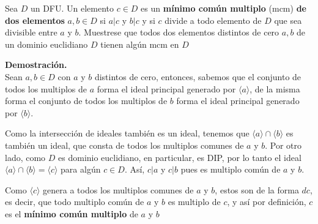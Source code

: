 Sea $D$ un DFU. Un elemento $c \in D$ es un \textbf{mínimo común multiplo} (mcm) \textbf{de dos elementos} $a,b \in D$ si $a | c$ y $b | c$ y si $c$ divide a todo elemento de $D$ que sea divisible entre $a$ y $b$. Muestrese que todos dos elementos distintos de cero $a,b$ de un dominio euclidiano $D$ tienen algún mcm en $D$

\textbf{Demostración.} \\
Sean $a,b \in D$ con $a$ y $b$ distintos de cero, entonces, sabemos que el conjunto de todos los multiplos de $a$ forma el ideal principal generado por $\langle a \rangle$, de la misma forma el conjunto de todos los multiplos de $b$ forma el ideal principal generado por $\langle b \rangle$. \smallskip
    
Como la intersección de ideales también es un ideal, tenemos que $\langle a \rangle \cap \langle b \rangle$ es también un ideal, que consta de todos los multiplos comunes de $a$ y $b$. Por otro lado, como $D$ es dominio euclidiano, en particular, es DIP, por lo tanto el ideal $\langle a \rangle \cap \langle b \rangle = \langle c \rangle$ para algún $c \in D$. Así, $c|a$ y $c|b$ pues es multiplo común de $a$ y $b$.

Como $\langle c \rangle$ genera a todos los multiplos comunes de $a$ y $b$, estos son de la forma $dc$, es decir, que todo multiplo común de $a$ y $b$ es multiplo de $c$, y así por definición, $c$ es el \textbf{mínimo común multiplo} de $a$ y $b$ 
